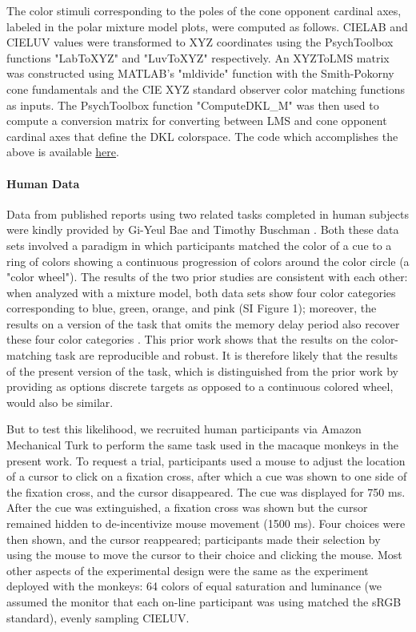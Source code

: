 \documentclass[9pt,biorxiv,lineno,onehalfspacing]{lapreprint}
\begin{document}
\begin{refsection}
The color stimuli corresponding to the poles of the cone opponent cardinal axes, labeled in the polar mixture model plots, were computed as follows. 
CIELAB and CIELUV values were transformed to XYZ coordinates using the PsychToolbox functions "LabToXYZ" and "LuvToXYZ" respectively.
An XYZToLMS matrix was constructed using MATLAB's "mldivide" function with the Smith-Pokorny cone fundamentals and the CIE XYZ standard observer color matching functions as inputs.
The PsychToolbox function "ComputeDKL\_M" was then used to compute a conversion matrix for converting between LMS and cone opponent cardinal axes that define the DKL colorspace. 
The code which accomplishes the above is available \href{https://github.com/NEI-LSR/MacaqueColorCategories/blob/main/Analyses/DKL/computeDKL_XYZ.m}{here}.

\paragraph{Human Data}

Data from published reports using two related tasks completed in human subjects were kindly provided by Gi-Yeul Bae \citep{bae_why_2015} and Timothy Buschman \citep{panichello_error-correcting_2019}.
Both these data sets involved a paradigm in which participants matched the color of a cue to a ring of colors showing a continuous progression of colors around the color circle (a "color wheel"). 
The results of the two prior studies are consistent with each other: when analyzed with a mixture model, both data sets show four color categories corresponding to blue, green, orange, and pink (SI Figure 1); moreover, the results on a version of the task that omits the memory delay period also recover these four color categories \citep{bae_why_2015}.
This prior work shows that the results on the color-matching task are reproducible and robust. 
It is therefore likely that the results of the present version of the task, which is distinguished from the prior work by providing as options discrete targets as opposed to a continuous colored wheel, would also be similar. 

But to test this likelihood, we recruited human participants via Amazon Mechanical Turk to perform the same task used in the macaque monkeys in the present work. 
To request a trial, participants used a mouse to adjust the location of a cursor to click on a fixation cross, after which a cue was shown to one side of the fixation cross, and the cursor disappeared. 
The cue was displayed for 750 ms. 
After the cue was extinguished, a fixation cross was shown but the cursor remained hidden to de-incentivize mouse movement (1500 ms). 
Four choices were then shown, and the cursor reappeared; participants made their selection by using the mouse to move the cursor to their choice and clicking the mouse. 
Most other aspects of the experimental design were the same as the experiment deployed with the monkeys: 64 colors of equal saturation and luminance (we assumed the monitor that each on-line participant was using matched the sRGB standard), evenly sampling CIELUV. 


\end{refsection}
\end{document}
